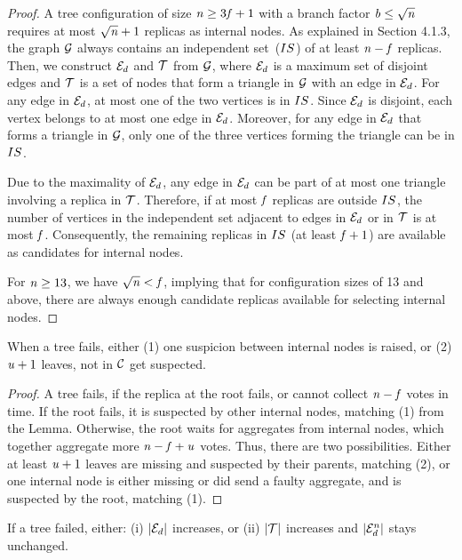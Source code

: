 \begin{proof}
  A tree configuration of size $\mathit{n} \ge 3\mathit{f}+1$ with a branch factor $\mathit{b} \leq \sqrt{\mathit{n}}$ requires at most $\sqrt{\mathit{n}}+1$ replicas as internal nodes.
  As explained in Section 4.1.3, the graph $\mathcal{G}$ always contains an independent set~($IS$) of at least $\mathit{n}-\mathit{f}$ replicas.
  Then, we construct $\mathcal{E}_d$ and $\mathcal{T}$ from $\mathcal{G}$, where $\mathcal{E}_d$ is a maximum set of disjoint edges and $\mathcal{T}$ is a set of nodes that form a triangle in $\mathcal{G}$ with an edge in $\mathcal{E}_d$.
  For any edge in $\mathcal{E}_d$, at most one of the two vertices is in $IS$.
  Since $\mathcal{E}_d$ is disjoint, each vertex belongs to at most one edge in $\mathcal{E}_d$.
  Moreover, for any edge in $\mathcal{E}_d$ that forms a triangle in $\mathcal{G}$, only one of the three vertices forming the triangle can be in $IS$.

  Due to the maximality of $\mathcal{E}_d$, any edge in $\mathcal{E}_d$ can be part of at most one triangle involving a replica in $\mathcal{T}$.
  Therefore, if at most $\mathit{f}$ replicas are outside $IS$, the number of vertices in the independent set adjacent to edges in $\mathcal{E}_d$ or in $\mathcal{T}$ is at most $\mathit{f}$.
  Consequently, the remaining replicas in $IS$ (at least $\mathit{f}+1$) are available as candidates for internal nodes.

  For $\mathit{n} \ge 13$, we have $\sqrt{\mathit{n}} < \mathit{f}$, implying that for configuration sizes of 13 and above, there are always enough candidate replicas available for selecting internal nodes.
\end{proof}

\begin{lemma}
  \label{lem:suspicions}
  When a tree fails, either (1) one suspicion between internal nodes is raised, or (2) $\mathit{u}+1$ leaves, not in $\mathcal{C}$ get suspected.
\end{lemma}
\begin{proof}
  A tree fails, if the replica at the root fails, or cannot collect $\mathit{n}-\mathit{f}$ votes in time.
  If the root fails, it is suspected by other internal nodes, matching (1) from the Lemma.
  Otherwise, the root waits for aggregates from internal nodes, which together aggregate more $\mathit{n}-\mathit{f}+\mathit{u}$ votes.
  Thus, there are two possibilities. Either at least $\mathit{u}+1$ leaves are missing and suspected by their parents, matching (2), or one internal node is either missing or did send a faulty aggregate, and is suspected by the root, matching (1).
\end{proof}

\begin{lemma}
  \label{lem:incu}
  If a tree failed, either: (i) $|\mathcal{E}_d|$ increases, or (ii) $|\mathcal{T}|$ increases and $|\mathcal{E}_d^n|$ stays unchanged.
\end{lemma}

